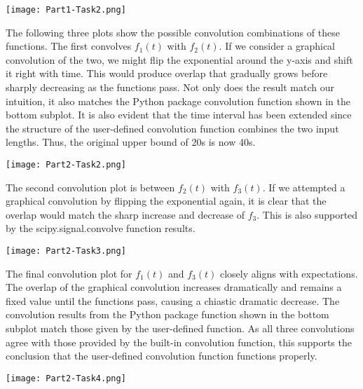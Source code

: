 \documentclass[12pt]{report}
\begin{document}
\begin{center}
	\texttt{[image: Part1-Task2.png]}\\[1.0 cm]
\end{center}

The following three plots show the possible convolution combinations of these functions. The first convolves $f_1(t)$ with $f_2(t)$. If we consider a graphical convolution of the two, we might flip the exponential around the y-axis and shift it right with time. This would produce overlap that gradually grows before sharply decreasing as the functions pass. Not only does the result match our intuition, it also matches the Python package convolution function shown in the bottom subplot. It is also evident that the time interval has been extended since the structure of the user-defined convolution function combines the two input lengths. Thus, the original upper bound of 20s is now 40s. \\

\begin{center}
	\texttt{[image: Part2-Task2.png]}\\[1.0 cm]
\end{center}

The second convolution plot is between $f_2(t)$ with $f_3(t)$. If we attempted a graphical convolution by flipping the exponential again, it is clear that the overlap would match the sharp increase and decrease of $f_3$. This is also supported by the scipy.signal.convolve function results. \\

\begin{center}
	\texttt{[image: Part2-Task3.png]}\\[1.0 cm]
\end{center}

The final convolution plot for $f_1(t)$ and $f_3(t)$ closely aligns with expectations. The overlap of the graphical convolution increases dramatically and remains a fixed value until the functions pass, causing a chiastic dramatic decrease. The convolution results from the Python package function shown in the bottom subplot match those given by the user-defined function. As all three convolutions agree with those provided by the built-in convolution function, this supports the conclusion that the user-defined convolution function functions properly. \\
	
\begin{center}
	\texttt{[image: Part2-Task4.png]}\\[1.0 cm]
\end{center}
	
\end{document}

